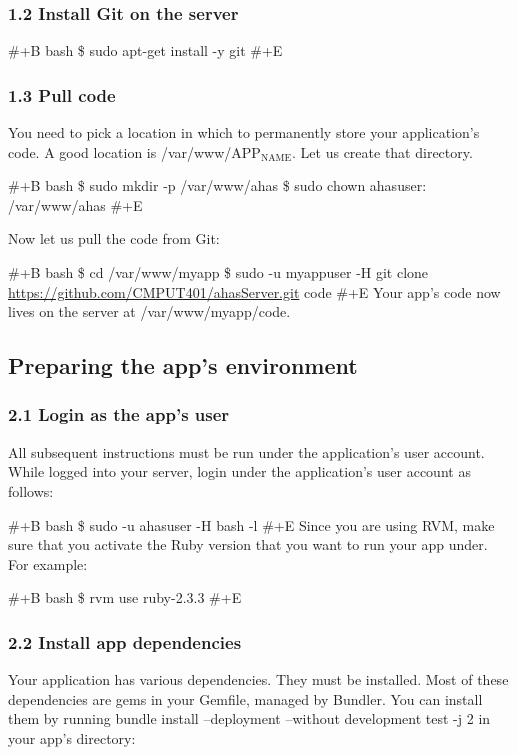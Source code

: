 \documentclass[11pt]{article}
\begin{document}
\subsubsection{1.2 Install Git on the server}
\label{sec:org5033d32}

\#+B bash
\$ sudo apt-get install -y git
\#+E
\subsubsection{1.3 Pull code}
\label{sec:org6db0c1c}

You need to pick a location in which to permanently store your application's code. A good location is /var/www/APP\(_{\text{NAME}}\). Let us create that directory.

\#+B bash
\$ sudo mkdir -p /var/www/ahas
\$ sudo chown ahasuser: /var/www/ahas
\#+E

Now let us pull the code from Git:

\#+B bash
\$ cd /var/www/myapp
\$ sudo -u myappuser -H git clone \url{https://github.com/CMPUT401/ahasServer.git} code
\#+E
Your app's code now lives on the server at /var/www/myapp/code.

\subsection{Preparing the app's environment}
\label{sec:org0741ad4}

\subsubsection{2.1 Login as the app's user}
\label{sec:org1a1029e}

All subsequent instructions must be run under the application's user account. While logged into your server, login under the application's user account as follows:

\#+B bash
\$ sudo -u ahasuser -H bash -l
\#+E
Since you are using RVM, make sure that you activate the Ruby version that you want to run your app under. For example:

\#+B bash
\$ rvm use ruby-2.3.3
\#+E
\subsubsection{2.2 Install app dependencies}
\label{sec:org3e5513e}

Your application has various dependencies. They must be installed. Most of these dependencies are gems in your Gemfile, managed by Bundler. You can install them by running bundle install --deployment --without development test -j 2 in your app's directory:
\end{document}
